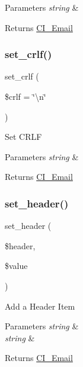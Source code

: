 \begin{DoxyParams}{Parameters}
{\em string} & \\
\hline
\end{DoxyParams}
\begin{DoxyReturn}{Returns}
\mbox{\hyperlink{class_c_i___email}{C\+I\+\_\+\+Email}} 
\end{DoxyReturn}
\mbox{\label{class_c_i___email_a85c81ed9eb7f4af42e69a07c6c6805d0}} 
\subsubsection{\texorpdfstring{set\+\_\+crlf()}{set\_crlf()}}
{\footnotesize\ttfamily set\+\_\+crlf (\begin{DoxyParamCaption}\item[{}]{\$crlf = {\ttfamily \char`\"{}\textbackslash{}n\char`\"{}} }\end{DoxyParamCaption})}

Set C\+R\+LF


\begin{DoxyParams}{Parameters}
{\em string} & \\
\hline
\end{DoxyParams}
\begin{DoxyReturn}{Returns}
\mbox{\hyperlink{class_c_i___email}{C\+I\+\_\+\+Email}} 
\end{DoxyReturn}
\mbox{\label{class_c_i___email_aff40701d50f18c87942be79f8b447247}} 
\subsubsection{\texorpdfstring{set\+\_\+header()}{set\_header()}}
{\footnotesize\ttfamily set\+\_\+header (\begin{DoxyParamCaption}\item[{}]{\$header,  }\item[{}]{\$value }\end{DoxyParamCaption})}

Add a Header Item


\begin{DoxyParams}{Parameters}
{\em string} & \\
\hline
{\em string} & \\
\hline
\end{DoxyParams}
\begin{DoxyReturn}{Returns}
\mbox{\hyperlink{class_c_i___email}{C\+I\+\_\+\+Email}} 
\end{DoxyReturn}
\mbox{\label{class_c_i___email_a9baeadff990ea673d75c3019c8cc3524}} 
